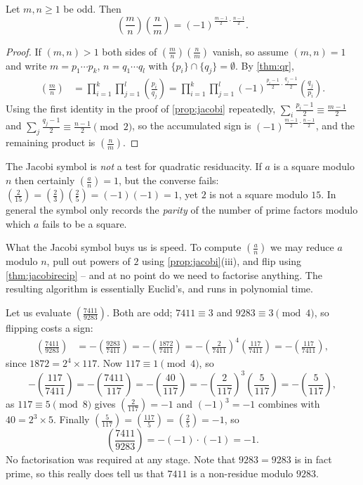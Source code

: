 \documentclass[a4paper]{scrartcl}
\newcommand{\leg}[2]{\left( \frac{#1}{#2} \right)}
\begin{document}
\begin{theorem}\label{thm:jacobirecip}
	Let $m, n \geq 1$ be odd. Then
	$$
	\leg mn \leg nm = (-1)^{\frac{m-1}2\cdot\frac{n-1}2}.
	$$
\end{theorem}
\begin{proof}
	If $(m, n) > 1$ both sides of $\left( \frac mn \right)\left( \frac nm \right)$ vanish, so assume $(m,n) = 1$ and write $m = p_1 \cdots p_k$, $n = q_1 \cdots q_l$ with $\{p_i\} \cap \{q_j\} = \emptyset$. By \autoref{thm:qr},
	\begin{align*}
		\leg mn &= \prod_{i=1}^k \prod_{j=1}^l \leg{p_i}{q_j} = \prod_{i=1}^k\prod_{j=1}^l (-1)^{\frac{p_i - 1}2 \cdot \frac{q_j - 1}2}\leg{q_j}{p_i}.
	\end{align*}
	Using the first identity in the proof of \autoref{prop:jacobi} repeatedly, $\sum_i \frac{p_i - 1}{2} \equiv \frac{m-1}{2}$ and $\sum_j \frac{q_j-1}2 \equiv \frac{n-1}2 \pmod 2$, so the accumulated sign is $(-1)^{\frac{m-1}2\cdot\frac{n-1}2}$, and the remaining product is $\left( \frac nm \right)$.
\end{proof}

\begin{remark}
	The Jacobi symbol is \emph{not} a test for quadratic residuacity. If $a$ is a square modulo $n$ then certainly $\left( \frac an \right) = 1$, but the converse fails: $\left( \frac2{15} \right) = \left( \frac23 \right)\left( \frac25 \right) = (-1)(-1) = 1$, yet $2$ is not a square modulo $15$. In general the symbol only records the \emph{parity} of the number of prime factors modulo which $a$ fails to be a square.
\end{remark}

What the Jacobi symbol buys us is speed. To compute $\left( \frac an \right)$ we may reduce $a$ modulo $n$, pull out powers of $2$ using \autoref{prop:jacobi}(iii), and flip using \autoref{thm:jacobirecip} -- and at no point do we need to factorise anything. The resulting algorithm is essentially Euclid's, and runs in polynomial time.

\begin{example}
	Let us evaluate $\left( \frac{7411}{9283} \right)$. Both are odd; $7411 \equiv 3$ and $9283 \equiv 3 \pmod 4$, so flipping costs a sign:
	\begin{align*}
		\leg{7411}{9283} &= -\leg{9283}{7411} = -\leg{1872}{7411} = -\leg{2}{7411}^4\leg{117}{7411} = -\leg{117}{7411},
	\end{align*}
	since $1872 = 2^4 \times 117$. Now $117 \equiv 1 \pmod 4$, so
	$$
	-\leg{117}{7411} = -\leg{7411}{117} = -\leg{40}{117} = -\leg 2{117}^3 \leg 5{117} = -\leg{5}{117},
	$$
	as $117 \equiv 5 \pmod 8$ gives $\left( \frac2{117} \right) = -1$ and $(-1)^3 = -1$ combines with $40 = 2^3 \times 5$. Finally $\left( \frac 5{117} \right) = \left( \frac{117}5 \right) = \left( \frac 25 \right) = -1$, so
	$$
	\leg{7411}{9283} = -(-1)\cdot(-1) = -1.
	$$
	No factorisation was required at any stage. Note that $9283 = 9283$ is in fact prime, so this really does tell us that $7411$ is a non-residue modulo $9283$.
\end{example}
\end{document}

